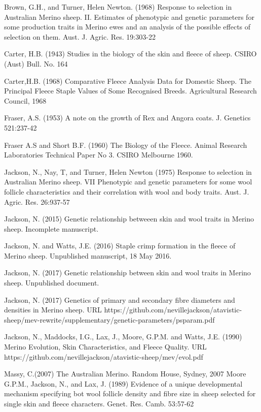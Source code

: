 \documentclass[titlepage]{article}  %
\begin{document}
\clearpage
\begin{thebibliography}{99}

Brown, G.H., and Turner, Helen Newton. (1968) Response to selection in Australian Merino sheep. II. Estimates of phenotypic and genetic parameters for some production traits in Merino ewes and an analysis of the possible effects of selection on them. Aust. J. Agric. Res. 19:303-22

Carter, H.B. (1943) Studies in the biology of the skin and fleece of sheep. CSIRO (Aust) Bull. No. 164

Carter,H.B. (1968) Comparative Fleece Analysis Data for Domestic Sheep. The Principal Fleece Staple Values of Some Recognised Breeds. Agricultural Research Council, 1968
 
Fraser, A.S. (1953) A note on the growth of Rex and Angora coats. J. Genetics 521:237-42

Fraser A.S and Short B.F. (1960) The Biology of the Fleece. Animal Research Laboratories Technical Paper No 3. CSIRO Melbourne 1960.

Jackson, N., Nay, T, and Turner, Helen Newton (1975) Response to selection in Australian Merino sheep. VII Phenotypic and genetic parameters for some wool follicle characteristics and their correlation with wool and body traits. Aust. J. Agric. Res. 26:937-57

Jackson, N. (2015) Genetic relationship betweeen skin and wool traits in Merino sheep. Incomplete manuscript.

Jackson, N. and Watts, J.E. (2016) Staple crimp formation in the fleece of Merino sheep. Unpublished manuscript, 18 May 2016.

Jackson, N. (2017) Genetic relationship between skin and wool traits in Merino sheep. Unpublished document.

Jackson, N. (2017) Genetics of primary and secondary fibre diameters and densities in Merino sheep. URL https://github.com/nevillejackson/atavistic-sheep/mev-rewrite/supplementary/genetic-parameters/psparam.pdf

Jackson, N., Maddocks, I.G., Lax, J., Moore, G.P.M. and Watts, J.E. (1990) Merino Evolution, Skin Characteristics, and Fleece Quality. URL https://github.com/nevillejackson/atavistic-sheep/mev/evol.pdf 

Massy, C.(2007) The Australian Merino. Random House, Sydney, 2007
Moore G.P.M., Jackson, N., and Lax, J. (1989) Evidence of a unique developmental mechanism specifying bot wool follicle density and fibre size in sheep selected for single skin and fleece characters. Genet. Res. Camb. 53:57-62


\end{thebibliography}
\end{document}
